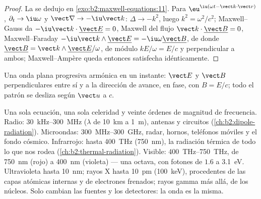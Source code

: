 \begin{proof}
La  se dedujo en \cref{exo:b2:maxwell-equations:11}.
Para $\eu^{\iu(\omega t - \vect k\cdot\vect r)}$, $\partial_t \to \iu\omega$ y $\vect\nabla \to
-\iu\vect k$: $\Delta \to -k^2$, luego $k^2 = \omega^2/c^2$; Maxwell--Gauss da $-\iu
\vect k\cdot\underline{\vect E} = 0$, Maxwell del flujo $\vect k\cdot\underline{\vect B} = 0$,
Maxwell--Faraday $-\iu\vect k\wedge\underline{\vect E} = -\iu\omega\underline{\vect B}$, de donde
$\underline{\vect B} = \vect k\wedge\underline{\vect E}/\omega$, de módulo $kE/\omega = E/c$ y
perpendicular a ambos; Maxwell--Ampère queda entonces satisfecha idénticamente.
\end{proof}

\begin{omfigure}

{\small Una onda plana progresiva armónica en un instante: $\vect E$ y
$\vect B$ perpendiculares entre sí y a la dirección de avance, en fase, con
$B = E/c$; todo el patrón se desliza según $\vect u$ a $c$.}
\end{omfigure}

\begin{remark}[El espectro]\label{rem:b2:plane-waves-polarization:spectrum}
Una sola ecuación, una sola celeridad y veinte órdenes de magnitud de
frecuencia. Radio: \qty{30}{kHz}--\qty{300}{MHz} ($\lambda$ de \qty{10}{km} a \qty{1}{m}),
antenas y circuitos (\cref{ch:b2:dipole-radiation}). Microondas:
\qty{300}{MHz}--\qty{300}{GHz}, radar, hornos, teléfonos móviles y el fondo
cósmico. Infrarrojo: hasta \qty{400}{THz} (\qty{750}{nm}), la radiación
térmica de todo lo que nos rodea (\cref{ch:b2:thermal-radiation}).
Visible: \qty{400}{THz}--\qty{750}{THz}, de \qty{750}{nm} (rojo) a \qty{400}{nm}
(violeta) --- una octava, con fotones de $1.6$ a \qty{3.1}{eV}. Ultravioleta hasta
\qty{10}{nm}; rayos X hasta \qty{10}{pm} (\qty{100}{keV}), procedentes de las capas
atómicas internas y de electrones frenados; rayos gamma más allá, de los
núcleos. Solo cambian las fuentes y los detectores: la onda es la misma.
\end{remark}

